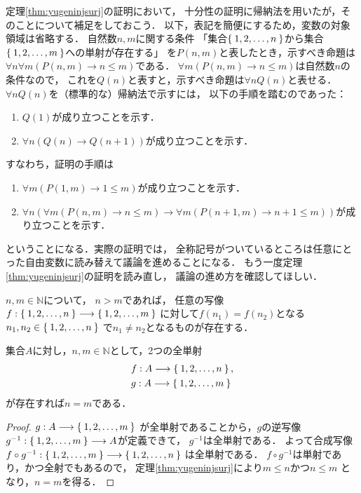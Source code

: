    定理\ref{thm:yugeninjsurj}の証明において，
   十分性の証明に帰納法を用いたが，そのことについて補足をしておこう．
   以下，表記を簡便にするため，変数の対象領域は省略する．
   自然数$n,m$に関する条件
   「集合$\Set{ 1, 2, \ldots , n}$から集合$\Set{ 1,2, \ldots , m}$への単射が存在する」
   を$P(n,m)$と表したとき，示すべき命題は
   $\forall n \forall m (P(n,m) \to n \leq m)$である．
   $\forall m ( P(n,m) \to n \leq m)$は自然数$n$の条件なので，
   これを$Q(n)$と表すと，示すべき命題は$\forall n Q(n)$と表せる．
   $\forall n Q(n)$を（標準的な）帰納法で示すには，
   以下の手順を踏むのであった：
   \begin{enumerate}[1. ]
     \item $Q(1)$が成り立つことを示す．
     \item $\forall n ( Q(n) \to Q(n+1) )$が成り立つことを示す．
   \end{enumerate}
   すなわち，証明の手順は
   \begin{enumerate}[1. ]
     \item $\forall m (P(1,m) \to 1 \leq m)$が成り立つことを示す．
     \item $\forall n ( \forall m (P(n,m) \to n \leq m) 
       \to  \forall m ( P(n+1,m) \to n+1 \leq m))$が成り立つことを示す．
   \end{enumerate}
   ということになる．実際の証明では，
   全称記号がついているところは任意にとった自由変数に読み替えて議論を進めることになる．
   もう一度定理\ref{thm:yugeninjsurj}の証明を読み直し，
   議論の進め方を確認してほしい．

   \begin{coro}[部屋割り論法]
     $n,  m \in \mathbb{N}$について，
     $n>m$であれば，
     任意の写像$f: \Set{ 1,  2,  \ldots ,  n}
     \longrightarrow \Set{ 1,  2,  \ldots ,  m}$
     に対して$f(n_1)=f(n_2)$となる
     $n_1 ,  n_2 \in \Set{ 1,  2,  \ldots ,  n}$
     で$n_1 \neq n_2$となるものが存在する．
   \end{coro}

    
   \begin{thm} \label{thm:cardinalwelldef}
     集合$A$に対し，$n,  m \in \mathbb{N}$として，2つの全単射
     \begin{align*}
       & f: A \longrightarrow \Set{ 1,  2,  \ldots ,  n} , \\
       & g:  A \longrightarrow \Set{ 1,  2,  \ldots ,  m}
     \end{align*}
     が存在すれば$n=m$である．
   \end{thm}

   \begin{proof}
     $g: A \longrightarrow \Set{1,  2,  \ldots ,  m} $
     が全単射であることから，$g$の逆写像
     $g^{-1} : \Set{ 1,  2,  \ldots ,  m} \longrightarrow A$が定義できて，
     $g^{-1}$は全単射である．
     よって合成写像$f \circ g^{-1} : 
     \Set{ 1,  2,  \ldots ,  m} \longrightarrow \Set{1,  2,  \ldots ,  n}$
     は全単射である．
     $f \circ g^{-1}$は単射であり，かつ全射でもあるので，
     定理\ref{thm:yugeninjsurj}により$m \leq n$かつ$n \leq m$
     となり，$n =m$を得る．
   \end{proof}


